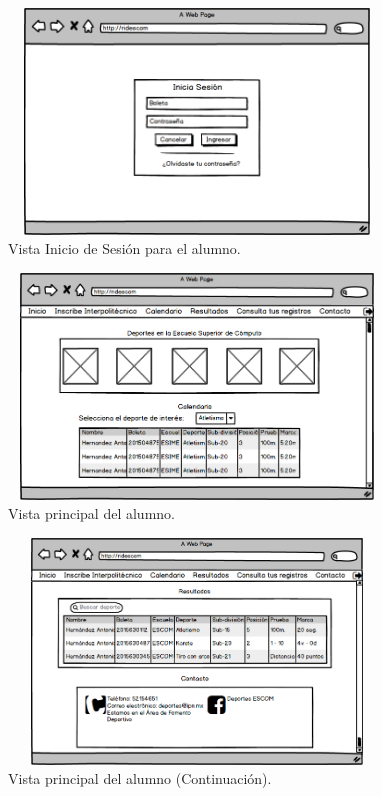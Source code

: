 		\begin{figure} [hbt!]
			\centering
			\includegraphics[width=10cm, height=6cm]{Imagenes/Nuevos/P17_Login_alumno}
			\caption{Vista Inicio de Sesión para el alumno.}
			\label{loginalumno}
		\end{figure}
	\pagebreak
		
		\begin{figure} [hbt!]
			\centering
			\includegraphics[width=10cm, height=6cm]{Imagenes/Nuevos/P18_Inicio_paticipante}
			\caption{Vista principal del alumno.}
			\label{principalalum}
		\end{figure}
		
		\begin{figure} [hbt!]
			\centering
			\includegraphics[width=10cm, height=6cm]{Imagenes/Nuevos/P19_Inicio_paticipante1}
			\caption{Vista principal del alumno (Continuación).}
			\label{principalalum1}
		\end{figure}
	
